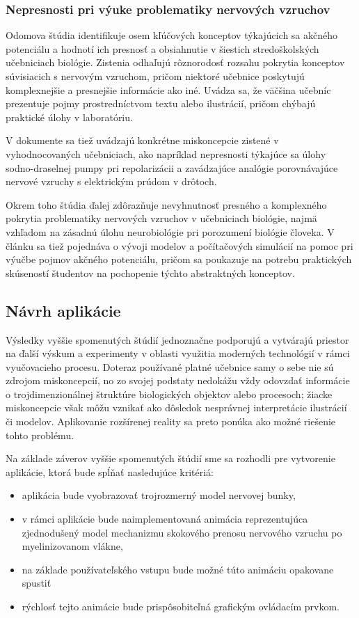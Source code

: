 \subsubsection{Nepresnosti pri výuke problematiky nervových vzruchov}
Odomova štúdia \cite{odomActionPotentialsBiology1993} identifikuje osem kľúčových konceptov týkajúcich sa akčného potenciálu a hodnotí ich presnosť a obsiahnutie v šiestich 
stredoškolských učebniciach biológie. Zistenia odhaľujú rôznorodosť rozsahu pokrytia konceptov súvisiacich s nervovým vzruchom, pričom niektoré učebnice poskytujú komplexnejšie 
a presnejšie informácie ako iné. Uvádza sa, že väčšina učebníc prezentuje pojmy prostredníctvom textu alebo ilustrácií, pričom chýbajú praktické úlohy v laboratóriu. 

V dokumente sa tiež uvádzajú konkrétne miskoncepcie zistené v vyhodnocovaných učebniciach, ako napríklad nepresnosti týkajúce sa úlohy sodno-draselnej pumpy pri repolarizácii 
a zavádzajúce analógie porovnávajúce nervové vzruchy s elektrickým prúdom v drôtoch. 

Okrem toho štúdia ďalej zdôrazňuje nevyhnutnosť presného a komplexného pokrytia problematiky nervových vzruchov v učebniciach biológie, najmä vzhľadom na zásadnú úlohu neurobiológie 
pri porozumení biológie človeka. V článku sa tiež pojednáva o vývoji modelov a počítačových simulácií na pomoc pri výučbe pojmov akčného potenciálu, pričom sa poukazuje na potrebu 
praktických skúseností študentov na pochopenie týchto abstraktných konceptov. 

\subsection{Návrh aplikácie}
Výsledky vyššie spomenutých štúdií jednoznačne podporujú a vytvárajú priestor na ďalší výskum a experimenty v oblasti využitia moderných technológií v rámci vyučovacieho procesu. Doteraz používané
platné učebnice samy o sebe nie sú zdrojom miskoncepcií, no zo svojej podstaty nedokážu vždy odovzdať informácie o trojdimenzionálnej štruktúre biologických objektov alebo procesoch; 
žiacke miskoncepcie však môžu vznikať ako dôsledok nesprávnej interpretácie ilustrácií či modelov. Aplikovanie rozšírenej reality sa preto ponúka ako možné riešenie tohto problému.

Na základe záverov vyššie spomenutých štúdií sme sa rozhodli pre vytvorenie aplikácie, ktorá bude spĺňať nasledujúce kritériá:
\begin{itemize}
  \item aplikácia bude vyobrazovať trojrozmerný model nervovej bunky,
  \item v rámci aplikácie bude naimplementovaná animácia reprezentujúca zjednodušený model mechanizmu skokového prenosu nervového vzruchu po myelinizovanom vlákne,
  \item na základe používateľského vstupu bude možné túto animáciu opakovane spustiť
  \item rýchlosť tejto animácie bude prispôsobiteľná grafickým ovládacím prvkom.
\end{itemize}

